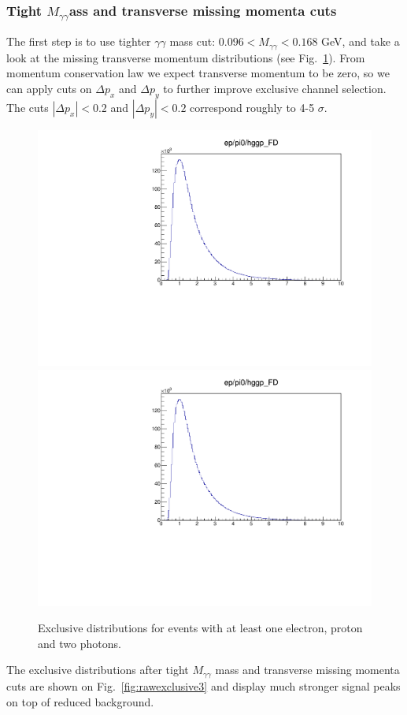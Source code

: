     \subsubsection{Tight \texorpdfstring{$M_{\gamma\gamma} $} mass and transverse missing momenta cuts}
    
    The first step is to use tighter $\gamma\gamma$ mass cut: $0.096<M_{\gamma\gamma}<0.168$ GeV, and take a look at the missing transverse momentum distributions (see Fig.~\ref{fig:ptdistributions}).
    From momentum conservation law we expect transverse momentum to be zero, so we can apply cuts on $\Delta p_x$ and $\Delta p_y$ to further improve exclusive channel selection.
    The cuts $|\Delta p_x|<0.2$ and $|\Delta p_y|<0.2$ correspond roughly to 4-5 $\sigma$.
    
    \begin{figure}[hbt]
    	\centering
    	\includegraphics[page=24,width=0.47\linewidth]{Chapters/Ch4-BaseAnalysis/1_Event_Selection_Cuts/figures/eppi0.exclusive.pdf}
    	\includegraphics[page=25,width=0.47\linewidth]{Chapters/Ch4-BaseAnalysis/1_Event_Selection_Cuts/figures/eppi0.exclusive.pdf}
    	\caption[Missing Transverse Momenta Distributions]{Exclusive distributions for events with at least one electron, proton and two photons.}
    	\label{fig:ptdistributions}
    \end{figure}
    
    The exclusive distributions after tight $M_{\gamma\gamma}$ mass and transverse missing momenta cuts are shown on Fig.~\ref{fig:rawexclusive3} and display much stronger signal peaks on top of reduced background.
    

